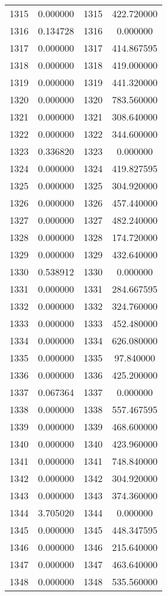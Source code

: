 \documentclass[12pt]{article}
\begin{document}
\begin{longtable}{@{}cccc@{}}
1315 & 0.000000 & 1315 & 422.720000 \\
1316 & 0.134728 & 1316 & 0.000000 \\
1317 & 0.000000 & 1317 & 414.867595 \\
1318 & 0.000000 & 1318 & 419.000000 \\
1319 & 0.000000 & 1319 & 441.320000 \\
1320 & 0.000000 & 1320 & 783.560000 \\
1321 & 0.000000 & 1321 & 308.640000 \\
1322 & 0.000000 & 1322 & 344.600000 \\
1323 & 0.336820 & 1323 & 0.000000 \\
1324 & 0.000000 & 1324 & 419.827595 \\
1325 & 0.000000 & 1325 & 304.920000 \\
1326 & 0.000000 & 1326 & 457.440000 \\
1327 & 0.000000 & 1327 & 482.240000 \\
1328 & 0.000000 & 1328 & 174.720000 \\
1329 & 0.000000 & 1329 & 432.640000 \\
1330 & 0.538912 & 1330 & 0.000000 \\
1331 & 0.000000 & 1331 & 284.667595 \\
1332 & 0.000000 & 1332 & 324.760000 \\
1333 & 0.000000 & 1333 & 452.480000 \\
1334 & 0.000000 & 1334 & 626.080000 \\
1335 & 0.000000 & 1335 & 97.840000 \\
1336 & 0.000000 & 1336 & 425.200000 \\
1337 & 0.067364 & 1337 & 0.000000 \\
1338 & 0.000000 & 1338 & 557.467595 \\
1339 & 0.000000 & 1339 & 468.600000 \\
1340 & 0.000000 & 1340 & 423.960000 \\
1341 & 0.000000 & 1341 & 748.840000 \\
1342 & 0.000000 & 1342 & 304.920000 \\
1343 & 0.000000 & 1343 & 374.360000 \\
1344 & 3.705020 & 1344 & 0.000000 \\
1345 & 0.000000 & 1345 & 448.347595 \\
1346 & 0.000000 & 1346 & 215.640000 \\
1347 & 0.000000 & 1347 & 463.640000 \\
1348 & 0.000000 & 1348 & 535.560000 \\

\end{longtable}
\end{document}
